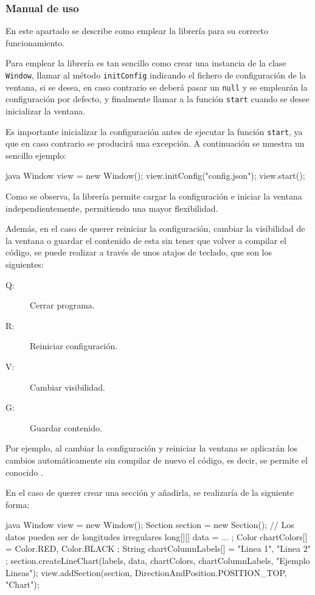 \subsubsection{Manual de uso}

En este apartado se describe como emplear la librería para su correcto funcionamiento.\bigskip

Para emplear la librería es tan sencillo como crear una instancia de la clase \texttt{Window}, llamar al método \texttt{initConfig} indicando el fichero de configuración de la ventana, si se desea, en caso contrario se deberá pasar un \texttt{null} y se emplearán la configuración por defecto, y finalmente llamar a la función \texttt{start} cuando se desee inicializar la ventana.\bigskip

Es importante inicializar la configuración antes de ejecutar la función \texttt{start}, ya que en caso contrario se producirá una excepción. A continuación se muestra un sencillo ejemplo:

\begin{code}{\scriptsize}{java}
Window view = new Window(); 
view.initConfig("config.json"); 
view.start(); 
\end{code}

Como se observa, la librería permite cargar la configuración e iniciar la ventana independientemente, permitiendo una mayor flexibilidad.\bigskip

Además, en el caso de querer reiniciar la configuración, cambiar la visibilidad de la ventana o guardar el contenido de esta sin tener que volver a compilar el código, se puede realizar a través de unos atajos de teclado, que son los siguientes:\medskip

\begin{description}
    \item[Q:] Cerrar programa.
    \item[R:] Reiniciar configuración.
    \item[V:] Cambiar visibilidad.
    \item[G:] Guardar contenido.
\end{description}\bigskip

Por ejemplo, al cambiar la configuración y reiniciar la ventana se aplicarán los cambios automáticamente sin compilar de nuevo el código, es decir, se permite el conocido .\bigskip

En el caso de querer crear una sección y añadirla, se realizaría de la siguiente forma:

\begin{code}{\scriptsize}{java}
Window view = new Window(); 
Section section = new Section();
// Los datos pueden ser de longitudes irregulares
long[][] data = { ... }; 
Color chartColors[] = { Color.RED, Color.BLACK };
String chartColumnLabels[] = { "Linea 1",
                               "Linea 2" };
section.createLineChart(labels, 
                        data, 
                        chartColors, 
                        chartColumnLabels, 
                        "Ejemplo Lineas");
view.addSection(section, 
                DirectionAndPosition.POSITION_TOP, 
                "Chart");
\end{code}

